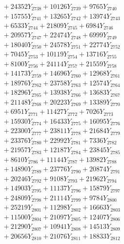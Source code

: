 \documentclass[a4paper,10pt]{article}
\begin{document}
{\begin{align}
&\;  + 24352 Y_{2738} + 10126 Y_{2739} + 9765 Y_{2740} \\[0.3ex]
&\;  + 15755 Y_{2741} + 13265 Y_{2742} + 13974 Y_{2743} \\[0.3ex]
&\;  + 6533 Y_{2744} + 21809 Y_{2745} + 6984 Y_{2746} \\[0.3ex]
&\;  + 20957 Y_{2747} + 22474 Y_{2748} + 6999 Y_{2749} \\[0.3ex]
&\;  + 18040 Y_{2750} + 24578 Y_{2751} + 22774 Y_{2752} \\[0.3ex]
&\;  + 7045 Y_{2753} + 10119 Y_{2754} + 13716 Y_{2755} \\[0.3ex]
&\;  + 8100 Y_{2756} + 24114 Y_{2757} + 21559 Y_{2758} \\[0.5ex]\allowbreak
&\;  + 14173 Y_{2759} + 14696 Y_{2760} + 12968 Y_{2761} \\[0.3ex]
&\;  + 18976 Y_{2762} + 23758 Y_{2763} + 12574 Y_{2764} \\[0.3ex]
&\;  + 18296 Y_{2765} + 13938 Y_{2766} + 13683 Y_{2767} \\[0.3ex]
&\;  + 21148 Y_{2768} + 20223 Y_{2769} + 13389 Y_{2770} \\[0.3ex]
&\;  + 6951 Y_{2771} + 11427 Y_{2772} + 7026 Y_{2773} \\[0.3ex]
&\;  + 15930 Y_{2774} + 16433 Y_{2775} + 16095 Y_{2776} \\[0.3ex]
&\;  + 22300 Y_{2777} + 23811 Y_{2778} + 21684 Y_{2779} \\[0.3ex]
&\;  + 23376 Y_{2780} + 22992 Y_{2781} + 7336 Y_{2782} \\[0.3ex]
&\;  + 21957 Y_{2783} + 12187 Y_{2784} + 23845 Y_{2785} \\[0.3ex]
&\;  + 8610 Y_{2786} + 11144 Y_{2787} + 13982 Y_{2788} \\[0.5ex]\allowbreak
&\;  + 14890 Y_{2789} + 23776 Y_{2790} + 20874 Y_{2791} \\[0.3ex]
&\;  + 20246 Y_{2792} + 9108 Y_{2793} + 21962 Y_{2794} \\[0.3ex]
&\;  + 14903 Y_{2795} + 11137 Y_{2796} + 15879 Y_{2797} \\[0.3ex]
&\;  + 24809 Y_{2798} + 21114 Y_{2799} + 9784 Y_{2800} \\[0.3ex]
&\;  + 25219 Y_{2801} + 11298 Y_{2802} + 16663 Y_{2803} \\[0.3ex]
&\;  + 11500 Y_{2804} + 21097 Y_{2805} + 12407 Y_{2806} \\[0.3ex]
&\;  + 21290 Y_{2807} + 10941 Y_{2808} + 14513 Y_{2809} \\[0.3ex]
&\;  + 20656 Y_{2810} + 21076 Y_{2811} + 18833 Y_{2812} \\[0.3ex]

\end{align}}
\end{document}
